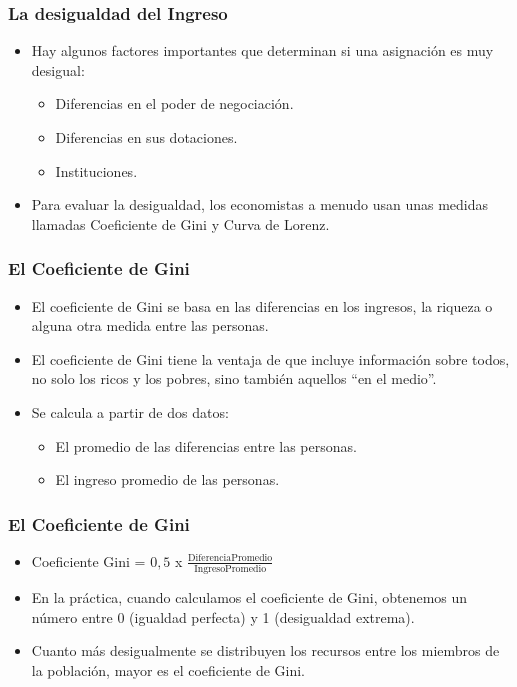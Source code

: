 \documentclass{beamer}
\begin{document}
\begin{frame} 
\frametitle{La desigualdad del Ingreso}
\begin{itemize}
\item Hay algunos factores importantes que determinan si una asignación es muy desigual: \begin{itemize}
    \item Diferencias en el poder de negociación.
    \item Diferencias en sus dotaciones.
    \item Instituciones.
\end{itemize}
\item Para evaluar la desigualdad, los economistas a menudo usan unas medidas llamadas Coeficiente de Gini y Curva de Lorenz.
\end{itemize}
\end{frame}

\begin{frame} 
\frametitle{El Coeficiente de Gini}
\begin{itemize}
\item El coeficiente de Gini se basa en las diferencias en los ingresos, la riqueza o alguna otra medida entre las personas. 
\item El coeficiente de Gini tiene la ventaja de que incluye información sobre todos, no solo los ricos y los pobres, sino también aquellos ``en el medio''.
\item Se calcula a partir de dos datos:
        \begin{itemize}
            \item El promedio de las diferencias entre las personas.
            \item El ingreso promedio de las personas.
        \end{itemize}
\end{itemize}
\end{frame}

\begin{frame} 
\frametitle{El Coeficiente de Gini}
\begin{itemize}
\item Coeficiente Gini = $0,5$ x  $\frac{\text{Diferencia}  \text{Promedio}}{\text{Ingreso} \text{Promedio}}$
\item En la práctica, cuando calculamos el coeficiente de Gini, obtenemos un número entre 0 (igualdad perfecta) y 1 (desigualdad extrema). 
\item Cuanto más desigualmente se distribuyen los recursos entre los miembros de la población, mayor es el coeficiente de Gini.
\end{itemize}
\end{frame}
\end{document}
